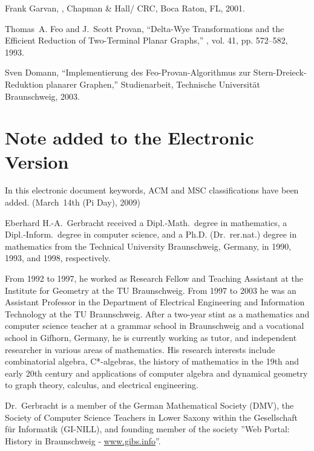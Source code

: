\documentclass[10pt,twocolumn,pagenumbers]{IEEEtran}
\begin{document}
\begin{thebibliography}{10}
Frank Garvan,
,
\newblock Chapman \& Hall/ CRC, Boca Raton, FL, 2001.

Thomas~A. Feo and J.~Scott Provan,
\newblock ``Delta-{W}ye {T}ransformations and the {E}fficient {R}eduction of
  {T}wo-{T}erminal {P}lanar {G}raphs,''
, vol. 41, pp. 572--582, 1993.

Sven Domann,
\newblock ``Implementierung des {F}eo-{P}rovan-{A}lgorithmus zur
  {S}tern-{D}reieck-{R}eduktion planarer {G}raphen,'' Studienarbeit, Technische
  Universit\"at Braunschweig, 2003.

\end{thebibliography}



\section*{Note added to the Electronic Version}
In this electronic document keywords, ACM and MSC classifications have been added. \hfill (March~14th (Pi Day), 2009)


\begin{biography}
{Eberhard H.-A.~Gerbracht}
received a Dipl.-Math.\ degree in mathematics, a Dipl.-Inform.\ degree in computer science, and a Ph.D. (Dr.\ rer.nat.) degree in mathematics from the Technical University Braunschweig, Germany, in 1990, 1993, and 1998, respectively.

\small From 1992 to 1997,  he worked as Research Fellow and Teaching Assistant at the Institute for Geometry at the TU Braunschweig. From 1997 to 2003 he was an Assistant Professor in the Department of Electrical Engineering and Information Technology at the TU Braunschweig. After a two-year stint as a mathematics and computer science teacher at a grammar school in Braunschweig and a vocational school in Gifhorn, Germany, he is currently working as tutor, and independent researcher in various areas of mathematics. His research interests include combinatorial algebra, C*-algebras, the history of mathematics in the 19th and early 20th century and applications of computer algebra and dynamical geometry to graph theory, calculus, and electrical engineering. 

\small
Dr.~Gerbracht is a member of the German Mathematical Society (DMV), the Society of Computer Science Teachers in Lower Saxony within the Gesellschaft f\"ur Informatik (GI-NILL), and founding member of the society ''Web Portal: History in Braunschweig - \href{http://www.gibs.info}{www.gibs.info}''.

\end{biography}
\end{document}
